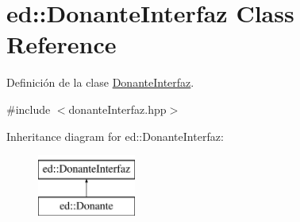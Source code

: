 \hypertarget{classed_1_1DonanteInterfaz}{\section{ed\-:\-:Donante\-Interfaz Class Reference}
\label{classed_1_1DonanteInterfaz}
}


Definición de la clase \hyperlink{classed_1_1DonanteInterfaz}{Donante\-Interfaz}.  




{\ttfamily \#include $<$donante\-Interfaz.\-hpp$>$}

Inheritance diagram for ed\-:\-:Donante\-Interfaz\-:\begin{figure}[H]
\begin{center}
\leavevmode
\includegraphics[height=2.000000cm]{classed_1_1DonanteInterfaz}
\end{center}
\end{figure}
